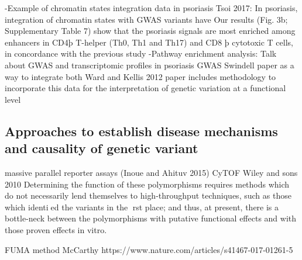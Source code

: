 -Example of chromatin states integration data in psoriasis Tsoi 2017: In psoriasis, integration of chromatin states with GWAS variants have
Our   results   (Fig.   3b;   Supplementary   Table   7)   show   that   the
 psoriasis signals are most enriched among enhancers in CD4þ T-helper (Th0, Th1 and Th17) and CD8 þ   cytotoxic T cells, in
 concordance with the previous study
-Pathway enrichment analysis: Talk about GWAS and transcriptomic profiles in psoriasis GWAS Swindell paper as a way to integrate both
Ward and Kellis 2012 paper includes methodology to incorporate this data for the interpretation of genetic variation at a functional level





\subsection{Approaches to establish disease mechanisms and causality of genetic variant}
massive parallel reporter assays (Inoue and Ahituv 2015)
CyTOF
Wiley and sons 2010
Determining the function of these polymorphisms requires methods which do not   necessarily   lend   themselves   to   high-throughput techniques, such as those which identied the variants in the rst place; and thus, at present, there is a bottle-neck between the polymorphisms with putative functional effects and with those proven effects in vitro.


FUMA method McCarthy
https://www.nature.com/articles/s41467-017-01261-5










